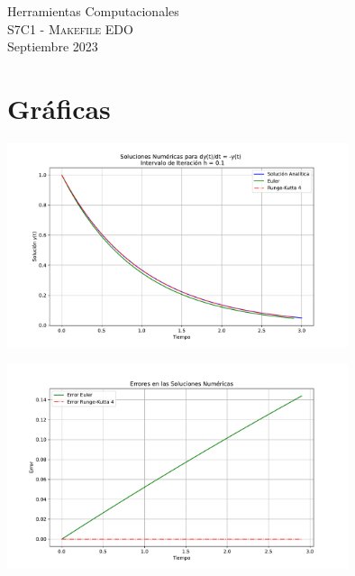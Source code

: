 \documentclass[11pt,letterpaper]{article}
\begin{document}
\begin{center}
{\Large Herramientas Computacionales} \\
S7C1 - \textsc{Makefile EDO}\\
Septiembre 2023\\
\end{center}


\noindent
\section{Gr\'aficas}
\begin{center}
\includegraphics[width=10cm]{plot_sol.pdf}
\end{center}  
\begin{center}
\includegraphics[width=10cm]{plot_errores.pdf} 
\end{center}
\end{document}

